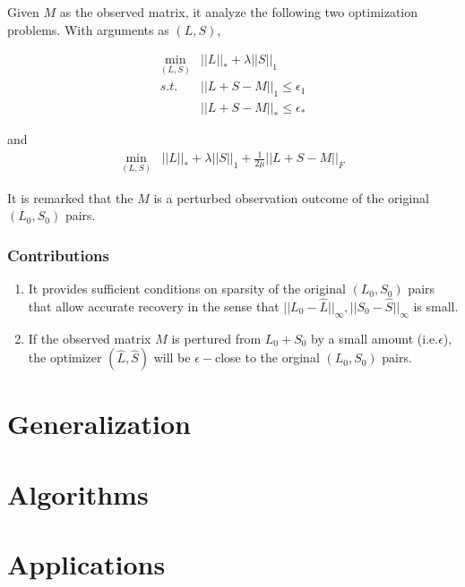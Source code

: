 \documentclass{../common/projectreport}
\begin{document}
Given $M$ as the observed matrix, it analyze the following two optimization problems. With arguments as $(L,S)$,

\begin{eqnarray}
\min_{(L,S)} & ||L||_{*}+\lambda||S||_{1}\nonumber \\
s.t. & ||L+S-M||_{1}\le\epsilon_{1}\\
 & ||L+S-M||_{*}\le\epsilon_{*}\nonumber
\end{eqnarray}


and
\begin{eqnarray}
\min_{(L,S)} & ||L||_{*}+\lambda||S||_{1}+\frac{1}{2\mu}||L+S-M||_{F}
\end{eqnarray}


It is remarked that the $M$ is a perturbed observation outcome of the original $(L_{0},S_{0})$ pairs.


\subsubsection{Contributions}
\begin{enumerate}
\item It provides sufficient conditions on sparsity of the original $(L_{0},S_{0})$ pairs that allow accurate recovery in the sense that $||L_{0}-\hat{L}||_{\infty},||S_{0}-\hat{S}||_{\infty}$ is small.
\item If the observed matrix $M$ is pertured from $L_{0}+S_{0}$ by a small amount (i.e.$\epsilon$), the optimizer $(\hat{L}, \hat{S})$ will be $\epsilon-$close to the orginal $(L_{0},S_{0})$ pairs.
\end{enumerate}


\section{Generalization}


\section{Algorithms}


\section{Applications}





\newpage


\end{document}
